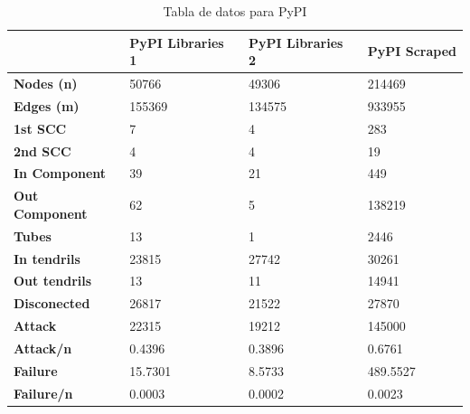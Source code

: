 \begin{table}[ht!]
    \centering
    \tiny
    \label{tab:data_pypi}
    \begin{tabular}{|l|l|l|l|}
        \hline
                               & \textbf{PyPI Libraries 1} & \textbf{PyPI Libraries 2} & \textbf{PyPI Scraped} \\
        \hline
        \textbf{Nodes (n)}     & 50766                     & 49306                     & 214469                \\
        \textbf{Edges (m)}     & 155369                    & 134575                    & 933955                \\
        \textbf{1st SCC}       & 7                         & 4                         & 283                   \\
        \textbf{2nd SCC}       & 4                         & 4                         & 19                    \\
        \textbf{In Component}  & 39                        & 21                        & 449                   \\
        \textbf{Out Component} & 62                        & 5                         & 138219                \\
        \textbf{Tubes}         & 13                        & 1                         & 2446                  \\
        \textbf{In tendrils}   & 23815                     & 27742                     & 30261                 \\
        \textbf{Out tendrils}  & 13                        & 11                        & 14941                 \\
        \textbf{Disconected}   & 26817                     & 21522                     & 27870                 \\
        \textbf{Attack}        & 22315                     & 19212                     & 145000                \\
        \textbf{Attack/n}      & 0.4396                    & 0.3896                    & 0.6761                \\
        \textbf{Failure}       & 15.7301                   & 8.5733                    & 489.5527              \\
        \textbf{Failure/n}     & 0.0003                    & 0.0002                    & 0.0023                \\
        \hline
    \end{tabular}
    \caption{Tabla de datos para PyPI}
\end{table}

